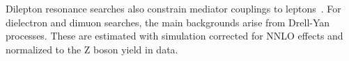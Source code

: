 Dilepton resonance searches also constrain mediator couplings to leptons~\cite{Aaboud:2017buh,Khachatryan:2016zqb}. 
For dielectron and dimuon searches, the main backgrounds arise from Drell-Yan processes. These are estimated with simulation corrected for NNLO effects and normalized to the Z boson yield in data.


